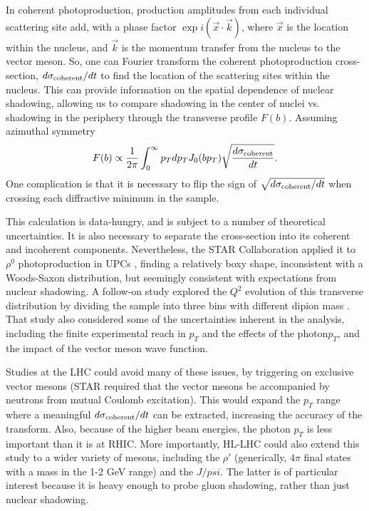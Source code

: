 \documentclass[../report.tex]{subfiles}
\begin{document}

In coherent photoproduction, production amplitudes from each individual scattering site add, with a phase factor $\exp{i(\vec{x}\cdot\vec{k})}$, where $\vec{x}$ is the location within the nucleus, and $\vec{k}$ is the momentum transfer from the nucleus to the vector meson.  So, one can Fourier transform the coherent photoproduction cross-section, $d\sigma_{\rm coherent}/dt$ to find the location of the scattering sites within the nucleus.  This can provide information on the spatial dependence of nuclear shadowing, allowing us to compare shadowing in the center of nuclei vs. shadowing in the periphery through the transverse profile $F(b)$.   Assuming azimuthal symmetry \cite{Diehl,Toll:2012mb}
\begin{equation}
F(b) \propto \frac{1}{2\pi} \int_0^\infty  p_T dp_T J_0(bp_T) \sqrt{\frac{d\sigma_{\rm coherent}}{dt}}.
\end{equation}
One complication is that it is necessary to flip the sign of $\sqrt{d\sigma_{\rm coherent}/dt}$ when crossing each diffractive minimum in the sample.

This calculation is  data-hungry, and is subject to a number of theoretical uncertainties.  It is also necessary to separate the cross-section into its coherent and incoherent components.  Nevertheless, the STAR Collaboration applied it to $\rho^0$ photoproduction in UPCs \cite{Adamczyk:2017vfu}, finding a relatively boxy shape, inconsistent with a Woods-Saxon distribution, but seemingly consistent with expectations from nuclear shadowing.   A follow-on study explored the  $Q^2$ evolution of this transverse distribution by dividing the sample into three bins with different dipion mass \cite{Klein:2018grn}.  That study also considered some of the uncertainties inherent in the analysis, including the finite experimental reach in $p_T$ and the effects of the photon$p_T$, and the impact of the vector meson wave function. 

Studies at the LHC could avoid many of these issues, by triggering on exclusive vector mesons (STAR required that the vector mesons be accompanied by neutrons from mutual Coulomb excitation).  This would expand the $p_T$ range where a meaningful $d\sigma_{\rm coherent}/dt$ can be extracted, increasing the accuracy of the transform.  Also, because of the higher beam energies, the photon $p_T$ is less important than it is at RHIC.    More importantly, HL-LHC could also extend this study to a wider variety of mesons, including the $\rho'$ (generically, $4\pi$ final states with a mass in the 1-2 GeV range) and the $J/psi$.  The latter is of particular interest because it is heavy enough to probe gluon shadowing, rather than just nuclear shadowing.  
\end{document}
